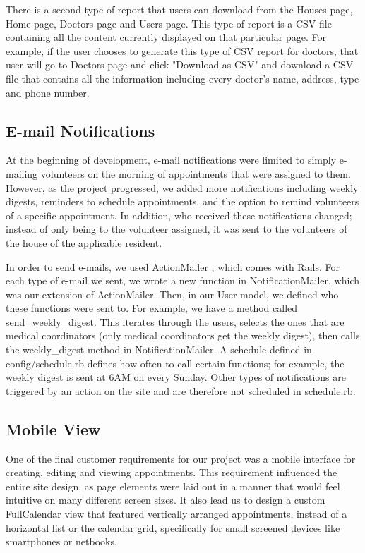 \documentclass{sig-alternate}
\begin{document}
There is a second type of report that users can download from the Houses page, Home page, Doctors page and Users page. This type of report is a CSV file containing all the content currently displayed on that particular page. For example, if the user chooses to generate this type of CSV report for doctors, that user will go to Doctors page and click "Download as CSV" and download a CSV file that contains all the information including every doctor's name, address, type and phone number. 

\subsection{E-mail Notifications}
At the beginning of development, e-mail notifications were limited to simply e-mailing volunteers on the morning of appointments that were assigned to them. However, as the project progressed, we added more notifications including weekly digests, reminders to schedule appointments, and the option to remind volunteers of a specific appointment. In addition, who received these notifications changed; instead of only being to the volunteer assigned, it was sent to the volunteers of the house of the applicable resident.

In order to send e-mails, we used ActionMailer \cite{actionmailer}, which comes with Rails. For each type of e-mail we sent, we wrote a new function in NotificationMailer, which was our extension of ActionMailer. Then, in our User model, we defined who these functions were sent to. For example, we have a method called send\_weekly\_digest.  This iterates through the users, selects the ones that are medical coordinators (only medical coordinators get the weekly digest), then calls the weekly\_digest method in NotificationMailer. A schedule defined in config/schedule.rb defines how often to call certain functions; for example, the weekly digest is sent at 6AM on every Sunday. Other types of notifications are triggered by an action on the site and are therefore not scheduled in schedule.rb. 

\subsection{Mobile View}
One of the final customer requirements for our project was a mobile interface for creating, editing and viewing appointments. This requirement influenced the entire site design, as page elements were laid out in a manner that would feel intuitive on many different screen sizes. It also lead us to design a custom FullCalendar view that featured vertically arranged appointments, instead of a horizontal list or the calendar grid, specifically for small screened devices like smartphones or netbooks.
\end{document}
